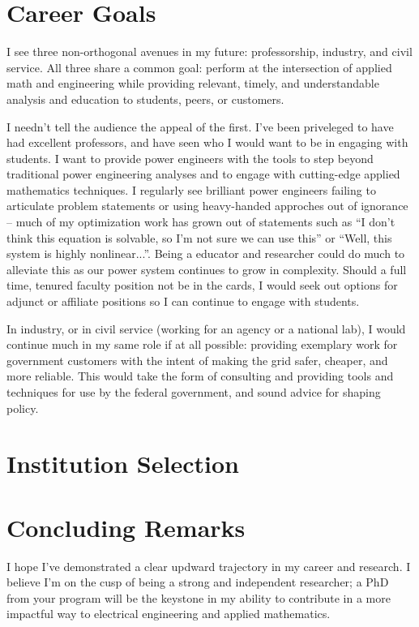 \documentclass[letterpaper]{article}
\begin{document}
\section*{Career Goals}
I see three non-orthogonal avenues in my future: professorship, industry, and civil service.
All three share a common goal: perform at the intersection of applied math and engineering
while providing relevant, timely, and understandable analysis and education to students,
peers, or customers.

I needn't tell the audience the appeal of the first. I've been priveleged to have had
excellent professors, and have seen who I would want to be in engaging with students. I want
to provide power engineers with the tools to step beyond traditional power engineering
analyses and to engage with cutting-edge applied mathematics techniques. I regularly see
brilliant power engineers failing to articulate problem statements or using heavy-handed
approches out of ignorance -- much of my optimization work has grown out of statements
such as ``I don't think this equation is solvable, so I'm not sure we can use this''  or
``Well, this system is highly nonlinear...''. Being a educator and researcher could do
much to alleviate this as our power system continues to grow in complexity. Should a
full time, tenured faculty position not be in the cards, I would seek out options for
adjunct or affiliate positions so I can continue to engage with students.

In industry, or in civil service (working for an agency or a national lab), I would continue
much in my same role if at all possible: providing exemplary work for government customers
with the intent of making the grid safer, cheaper, and more reliable. This would take the
form of consulting and providing tools and techniques for use by the federal government,
and sound advice for shaping policy.


\section*{Institution Selection}

\section*{Concluding Remarks}
I hope I've demonstrated a clear updward trajectory in my career and research. I believe
I'm on the cusp of being a strong and independent researcher; a PhD from your program
will be the keystone in my ability to contribute in a more impactful way to electrical
engineering and applied mathematics.
\end{document}
